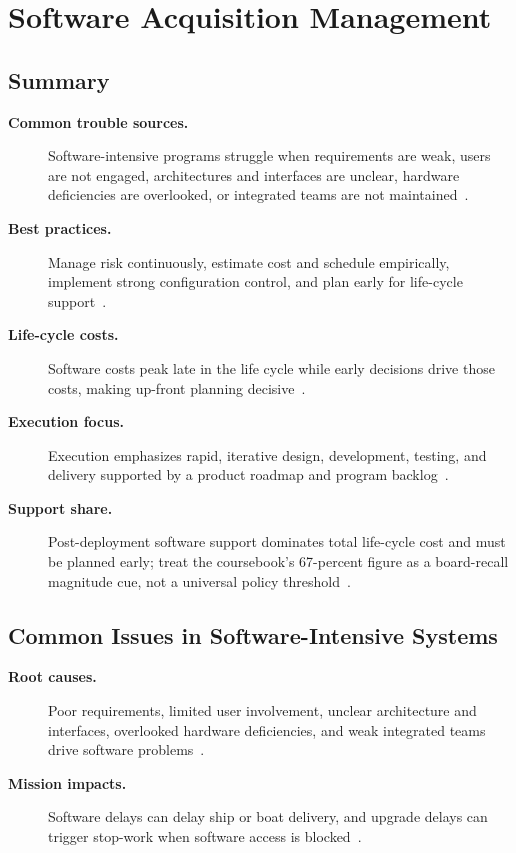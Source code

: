 \documentclass[../main.tex]{subfiles}
\begin{document}
\section{Software Acquisition Management}

\subsection{Summary}
\begin{description}
  \item[\textbf{Common trouble sources.}] Software-intensive programs struggle when requirements are weak, users are not engaged, architectures and interfaces are unclear, hardware deficiencies are overlooked, or integrated teams are not maintained~\autocite{edo-3-4-2-software-acquisition-management-2025}.
  \item[\textbf{Best practices.}] Manage risk continuously, estimate cost and schedule empirically, implement strong configuration control, and plan early for life-cycle support~\autocite{edo-3-4-2-software-acquisition-management-2025}.
  \item[\textbf{Life-cycle costs.}] Software costs peak late in the life cycle while early decisions drive those costs, making up-front planning decisive~\autocite{edo-3-4-2-software-acquisition-management-2025}.
  \item[\textbf{Execution focus.}] Execution emphasizes rapid, iterative design, development, testing, and delivery supported by a product roadmap and program backlog~\autocite{edo-3-4-2-software-acquisition-management-2025,DoDI5000-87}.
  \item[\textbf{Support share.}] Post-deployment software support dominates total life-cycle cost and must be planned early; treat the coursebook's 67-percent figure as a board-recall magnitude cue, not a universal policy threshold~\autocite{edo-3-4-2-software-acquisition-management-2025}.
\end{description}

\subsection{Common Issues in Software-Intensive Systems}
\begin{description}
  \item[\textbf{Root causes.}] Poor requirements, limited user involvement, unclear architecture and interfaces, overlooked hardware deficiencies, and weak integrated teams drive software problems~\autocite{edo-3-4-2-software-acquisition-management-2025}.
  \item[\textbf{Mission impacts.}] Software delays can delay ship or boat delivery, and upgrade delays can trigger stop-work when software access is blocked~\autocite{edo-3-4-2-software-acquisition-management-2025}.
\end{description}
\end{document}
